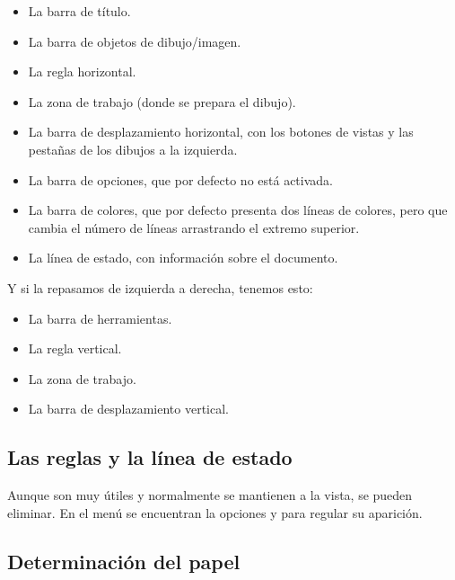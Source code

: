 \begin{itemize}
\item La barra de título.

\item La barra de objetos de dibujo/imagen.

\item La regla horizontal.

\item La zona de trabajo (donde se prepara el dibujo).

\item La barra de desplazamiento horizontal, con los botones de vistas 
y las pestañas de los dibujos a la izquierda.

\item La barra de opciones, que por defecto no está activada.

\item La barra de colores, que por defecto presenta dos líneas de 
colores, pero que cambia el número de líneas arrastrando el extremo 
superior.

\item La línea de estado, con información sobre el documento.
\end{itemize}

Y si la repasamos de izquierda a derecha, tenemos esto:

\begin{itemize}
\item La barra de herramientas.

\item La regla vertical.

\item La zona de trabajo.

\item La barra de desplazamiento vertical.
\end{itemize}

\subsection{Las reglas y la línea de estado}

Aunque son muy útiles y normalmente se mantienen a la vista, se pueden
eliminar. En el menú  se encuentran la opciones
 y  para regular su aparición.

\subsection{Determinación del papel}

